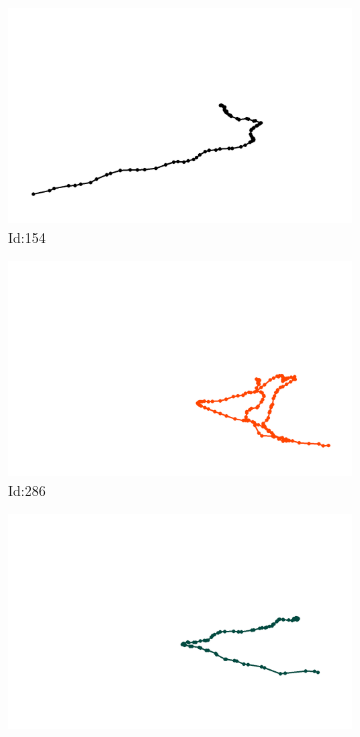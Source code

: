 \documentclass[12pt,twoside]{report}
\begin{document}
\begin{figure}
\centering
\begin{subfigure}[b]{0.20\textwidth}
\centering
\includegraphics[width=\textwidth]{../trajectories/154.png}
\caption{Id:154}
\end{subfigure}
\begin{subfigure}[b]{0.20\textwidth}
\centering
\includegraphics[width=\textwidth]{../trajectories/286.png}
\caption{Id:286}
\end{subfigure}
\begin{subfigure}[b]{0.20\textwidth}
\centering
\includegraphics[width=\textwidth]{../trajectories/304.png}

\end{subfigure}
\end{figure}
\end{document}
